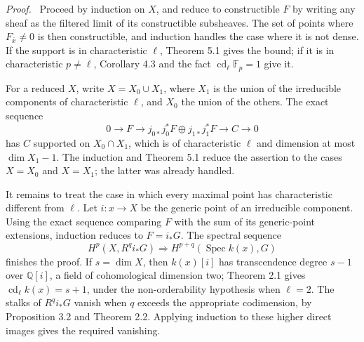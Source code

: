\documentclass[11pt]{article}
\newcommand{\Spec}{\operatorname{Spec}}
\newenvironment{prooftext}{\par\noindent\emph{Proof.}\ }{\par\medskip}
\newcommand{\Qq}{\mathbb{Q}}
\begin{document}
\begin{prooftext}
Proceed by induction on \(X\), and reduce to constructible \(F\) by writing any sheaf as the filtered limit of its constructible subsheaves. The set of points where \(F_{\bar x}\ne0\) is then constructible, and induction handles the case where it is not dense. If the support is in characteristic \(\ell\), Theorem 5.1 gives the bound; if it is in characteristic \(p\ne\ell\), Corollary 4.3 and the fact \(\operatorname{cd}_\ell\mathbb{F}_p=1\) give it.

For a reduced \(X\), write \(X=X_0\cup X_1\), where \(X_1\) is the union of the irreducible components of characteristic \(\ell\), and \(X_0\) the union of the others. The exact sequence
\[
0\to F\to j_{0*}j_0^*F\oplus j_{1*}j_1^*F\to C\to0
\]
has \(C\) supported on \(X_0\cap X_1\), which is of characteristic \(\ell\) and dimension at most \(\dim X_1-1\). The induction and Theorem 5.1 reduce the assertion to the cases \(X=X_0\) and \(X=X_1\); the latter was already handled.

It remains to treat the case in which every maximal point has characteristic different from \(\ell\). Let \(i:x\to X\) be the generic point of an irreducible component. Using the exact sequence comparing \(F\) with the sum of its generic-point extensions, induction reduces to \(F=i_*G\). The spectral sequence
\[
H^p(X,R^qi_*G)\Longrightarrow H^{p+q}(\Spec k(x),G)
\]
finishes the proof. If \(s=\dim X\), then \(k(x)[i]\) has transcendence degree \(s-1\) over \(\Qq[i]\), a field of cohomological dimension two; Theorem 2.1 gives \(\operatorname{cd}_\ell k(x)=s+1\), under the non-orderability hypothesis when \(\ell=2\). The stalks of \(R^qi_*G\) vanish when \(q\) exceeds the appropriate codimension, by Proposition 3.2 and Theorem 2.2. Applying induction to these higher direct images gives the required vanishing.
\end{prooftext}
\end{document}
